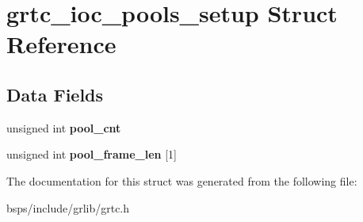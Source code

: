 \hypertarget{structgrtc__ioc__pools__setup}{}\section{grtc\+\_\+ioc\+\_\+pools\+\_\+setup Struct Reference}
\label{structgrtc__ioc__pools__setup}
\subsection*{Data Fields}
\begin{DoxyCompactItemize}
\item 
\mbox{\label{structgrtc__ioc__pools__setup_ae524a45f15b6667503e0bcb53d11ecbe}} 
unsigned int {\bfseries pool\+\_\+cnt}
\item 
\mbox{\label{structgrtc__ioc__pools__setup_aae6a33d12c6c452dba6aabbc8e2059f8}} 
unsigned int {\bfseries pool\+\_\+frame\+\_\+len} \mbox{[}1\mbox{]}
\end{DoxyCompactItemize}


The documentation for this struct was generated from the following file\+:\begin{DoxyCompactItemize}
\item 
bsps/include/grlib/grtc.\+h\end{DoxyCompactItemize}
